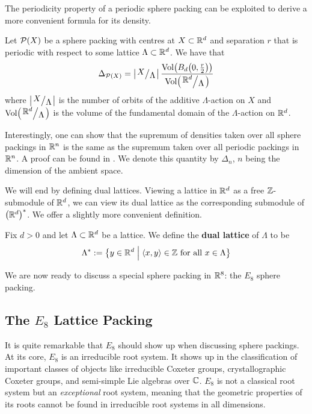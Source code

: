 The periodicity property of a periodic sphere packing can be exploited to derive a more convenient formula for its density.

\begin{boxproposition}\label{Ch2:Prop:Periodic_Density}
    Let $\mathcal{P}(X)$ be a sphere packing with centres at $X \subset \mathbb{R}^d$ and separation $r$ that is periodic with respect to some lattice $\Lambda \subset \mathbb{R}^d$. We have that
    \begin{align}
        \Delta_{\Pa(X)} = \abs{\quotient{X}{\Lambda}} \frac{\Volof{B_d\of{0, \frac{r}{2}}}}{\Volof{\quotient{\R^d}{\Lambda}}}
        \label{Ch2:Eq:Periodic_Density}
    \end{align}
    where $\abs{\quotient{X}{\Lambda}}$ is the number of orbits of the additive $\Lambda$-action on $X$ and $\Volof{\quotient{\R^d}{\Lambda}}$ is the volume of the fundamental domain of the $\Lambda$-action on $\mathbb{R}^d$.
\end{boxproposition}

Interestingly, one can show that the supremum of densities taken over all sphere packings in $\mathbb{R}^n$ is the same as the supremum taken over all periodic packings in $\mathbb{R}^n$. A proof can be found in \cite[Appendix A]{CohnElkies}. We denote this quantity by $\Delta_n$, $n$ being the dimension of the ambient space.

We will end by defining dual lattices. Viewing a lattice in $\mathbb{R}^d$ as a free $\mathbb{Z}$-submodule of $\mathbb{R}^d$, we can view its dual lattice as the corresponding submodule of $\left( \mathbb{R}^d \right)^*$. We offer a slightly more convenient definition.

\begin{boxdefinition}\label{Ch2:Def:Dual_Lattice}
    Fix $d > 0$ and let $\Lambda \subset \mathbb{R}^d$ be a lattice. We define the \textbf{dual lattice} of $\Lambda$ to be
    \begin{align*}
        \Lambda^* := \left\{ y \in \mathbb{R}^d \; \middle\vert \; \left\langle x, y \right\rangle \in \mathbb{Z} \text{ for all } x \in \Lambda \right\}
    \end{align*}
\end{boxdefinition}

We are now ready to discuss a special sphere packing in $\mathbb{R}^8$: the $E_8$ sphere packing.

\subsection{The $E_8$ Lattice Packing}\label{Ch2:Subsec:E8}

It is quite remarkable that $E_8$ should show up when discussing sphere packings. At its core, $E_8$ is an irreducible root system. It shows up in the classification of important classes of objects like irreducible Coxeter groups, crystallographic Coxeter groups, and semi-simple Lie algebras over $\mathbb{C}$. $E_8$ is not a classical root system but an \textit{exceptional} root system, meaning that the geometric properties of its roots cannot be found in irreducible root systems in all dimensions.

